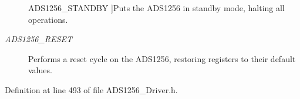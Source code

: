 \begin{Desc}
\begin{description}
{\hypertarget{group__ads1256__driver_ggadb203fb3b246881a33160b5b25822d42ac774622b486ccde765515c2de6b45bda}{A\-D\-S1256\-\_\-\-S\-T\-A\-N\-D\-B\-Y}\label{group__ads1256__driver_ggadb203fb3b246881a33160b5b25822d42ac774622b486ccde765515c2de6b45bda}
}]Puts the A\-D\-S1256 in standby mode, halting all operations. \item[{\em 
\hypertarget{group__ads1256__driver_ggadb203fb3b246881a33160b5b25822d42a5d52692a6ccf9bb846ba1844057243c7}{A\-D\-S1256\-\_\-\-R\-E\-S\-E\-T}\label{group__ads1256__driver_ggadb203fb3b246881a33160b5b25822d42a5d52692a6ccf9bb846ba1844057243c7}
}]Performs a reset cycle on the A\-D\-S1256, restoring registers to their default values. \end{description}
\end{Desc}


Definition at line 493 of file A\-D\-S1256\-\_\-\-Driver.\-h.

